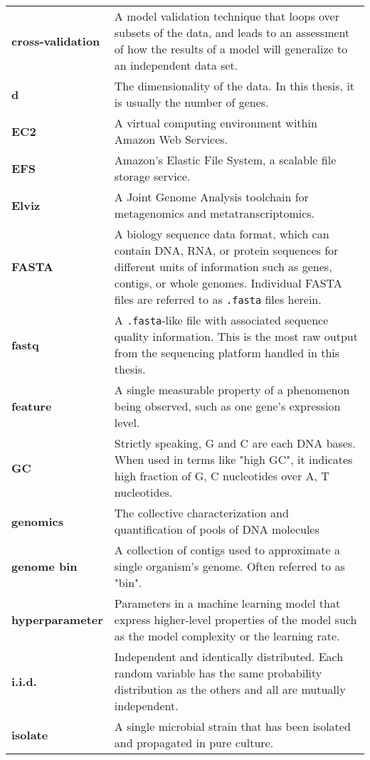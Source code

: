 \begin{singlespace}
\begin{longtable}{ p{}  p{} }
\textbf{cross-validation} &  A model validation technique that loops over subsets of the data, and leads to an assessment of how the results of a model will generalize to an independent data set.  \\
\textbf{d} & The dimensionality of the data.  In this thesis, it is usually the number of genes. \\
\textbf{EC2} & A virtual computing environment within Amazon Web Services. \\
\textbf{EFS} & Amazon's Elastic File System, a scalable file storage service.  \\
\textbf{Elviz} & A Joint Genome Analysis toolchain for metagenomics and metatranscriptomics.  \\
\textbf{FASTA} &  A biology sequence data format, which can contain DNA, RNA, or protein sequences for different units of information such as genes, contigs, or whole genomes.  Individual FASTA files are referred to as \texttt{.fasta} files herein.  \\
\textbf{fastq} & A \texttt{.fasta}-like file with associated sequence quality information.  This is the most raw output from the sequencing platform handled in this thesis. \\
\textbf{feature} & A single measurable property of a phenomenon being observed, such as one gene's expression level. \\
\textbf{GC} & Strictly speaking, G and C are each DNA bases.
	When used in terms like "high GC", it indicates high fraction of G, C nucleotides over A, T nucleotides. \\
\textbf{genomics} & The collective characterization and quantification of pools of DNA molecules \\
\textbf{genome bin} & A collection of contigs used to approximate a single organism's genome.  Often referred to as "bin". \\
\textbf{hyperparameter} & Parameters in a machine learning model that express higher-level properties of the model such as the model complexity or the learning rate. \\
\textbf{i.i.d.} & Independent and identically distributed.
    Each random variable has the same probability distribution as the others and all are mutually independent. \\
\textbf{isolate} & A single microbial strain that has been isolated and propagated in pure culture. \\

\end{longtable}
\end{singlespace}
